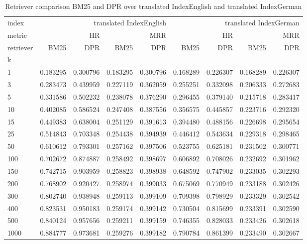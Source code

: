 \begin{table}
    \centering    
    \begin{tabular}{lrrrrrrrr}
    \toprule
    index & \multicolumn{4}{r}{translated IndexEnglish} & \multicolumn{4}{r}{translated IndexGerman} \\
    metric & \multicolumn{2}{r}{HR} & \multicolumn{2}{r}{MRR} & \multicolumn{2}{r}{HR} & \multicolumn{2}{r}{MRR} \\
    retriever & BM25 & DPR & BM25 & DPR & BM25 & DPR & BM25 & DPR \\
    k &  &  &  &  &  &  &  &  \\
    \midrule
    1 & 0.183295 & 0.300796 & 0.183295 & 0.300796 & 0.168289 & 0.226307 & 0.168289 & 0.226307 \\
    3 & 0.283473 & 0.439959 & 0.227119 & 0.362059 & 0.255251 & 0.332098 & 0.206333 & 0.272683 \\
    5 & 0.331586 & 0.502232 & 0.238078 & 0.376290 & 0.296455 & 0.379140 & 0.215718 & 0.283417 \\
    10 & 0.402085 & 0.586524 & 0.247408 & 0.387556 & 0.356575 & 0.445857 & 0.223716 & 0.292320 \\
    15 & 0.449383 & 0.638004 & 0.251129 & 0.391613 & 0.394480 & 0.488156 & 0.226698 & 0.295654 \\
    25 & 0.514843 & 0.703348 & 0.254438 & 0.394939 & 0.446412 & 0.543634 & 0.229318 & 0.298465 \\
    50 & 0.610612 & 0.793301 & 0.257162 & 0.397506 & 0.523755 & 0.625181 & 0.231502 & 0.300771 \\
    100 & 0.702672 & 0.874887 & 0.258492 & 0.398697 & 0.606892 & 0.708026 & 0.232692 & 0.301962 \\
    150 & 0.742715 & 0.903959 & 0.258823 & 0.398938 & 0.648592 & 0.747902 & 0.233035 & 0.302293 \\
    200 & 0.768902 & 0.920427 & 0.258974 & 0.399033 & 0.675069 & 0.770949 & 0.233188 & 0.302426 \\
    300 & 0.802740 & 0.938948 & 0.259113 & 0.399109 & 0.709398 & 0.798929 & 0.233329 & 0.302542 \\
    400 & 0.823531 & 0.950183 & 0.259174 & 0.399142 & 0.730504 & 0.815699 & 0.233391 & 0.302590 \\
    500 & 0.840124 & 0.957656 & 0.259211 & 0.399159 & 0.746355 & 0.828033 & 0.233426 & 0.302618 \\
    1000 & 0.884777 & 0.973681 & 0.259276 & 0.399182 & 0.790784 & 0.861399 & 0.233490 & 0.302667 \\
    \bottomrule
    \end{tabular}
    \caption{Retriever comparison BM25 and DPR over translated IndexEnglish and translated IndexGerman}
\end{table}

